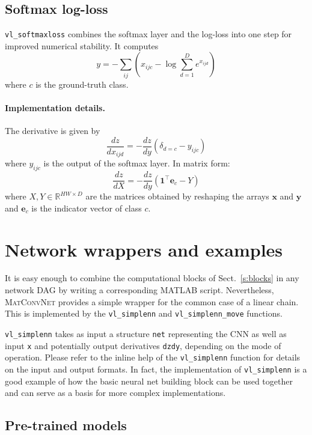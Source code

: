 \documentclass[12pt]{article}
\newcommand{\real}{\mathbb{R}}
\newcommand{\vlnn}{\textsc{MatConvNet}\xspace}
\newcommand{\bx}{\mathbf{x}}
\newcommand{\by}{\mathbf{y}}
\newcommand{\bfe}{\mathbf{e}}
\newcommand{\bone}{\mathbf{1}}
\begin{document}
\subsection{Softmax log-loss}\label{s:sfloss}

\verb!vl_softmaxloss! combines the softmax layer and the log-loss into one step for improved numerical stability. It computes
\[
y = - \sum_{ij} \left(
x_{ijc} - \log \sum_{d=1}^D e^{x_{ijd}}
\right)
\]
where $c$ is the ground-truth class.

\paragraph{Implementation details.} The derivative is given by
\[
\frac{dz}{dx_{ijd}} 
= - \frac{dz}{dy} \left(\delta_{d=c} - y_{ijc}\right)
\]
where $y_{ijc}$ is the output of the softmax layer. In matrix form:
\[
\frac{dz}{dX} 
= - \frac{dz}{dy} \left(\bone^\top \bfe_c - Y\right)
\]
where $X,Y\in\real^{HW\times D}$ are the matrices obtained by reshaping the arrays
$\bx$ and $\by$ and $\bfe_c$ is the indicator vector of class $c$.

\section{Network wrappers and examples}\label{s:wrappers}

It is easy enough to combine the computational blocks of Sect.~\ref{s:blocks} in any network DAG by writing a corresponding MATLAB script. Nevertheless, \vlnn provides a simple wrapper for the common case of a linear chain. This is implemented by the \verb!vl_simplenn! and \verb!vl_simplenn_move! functions.

\verb!vl_simplenn! takes as input a structure \verb!net! representing the CNN as well as input \verb!x! and potentially output derivatives \verb!dzdy!, depending on the mode of operation. Please refer to the inline help of the \verb!vl_simplenn! function for details on the input and output formats. In fact, the implementation of \verb!vl_simplenn! is a good example of how the basic neural net building block can be used together and can serve as a basis for more complex implementations.

\subsection{Pre-trained models}
\end{document}
